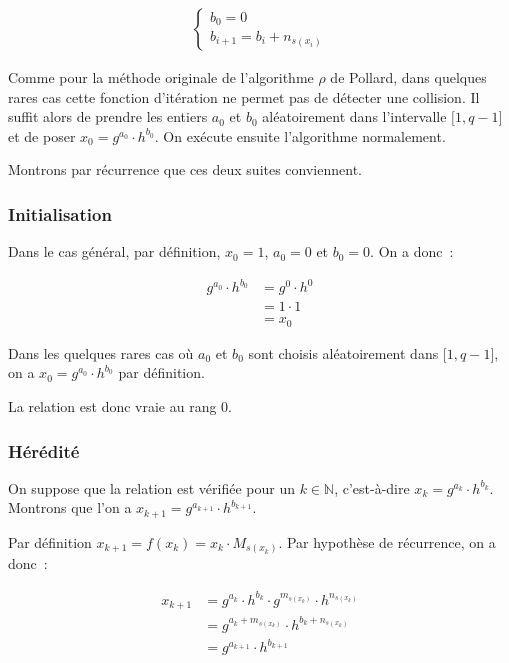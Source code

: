       \begin{align*}
        \begin{cases}
          b_0 = 0 \\
          b_{i+1} = b_i + n_{s(x_i)}
        \end{cases}
      \end{align*}

      Comme pour la méthode originale de l'algorithme $\rho$ de Pollard, dans quelques rares cas cette fonction d'itération ne permet pas de détecter une collision. Il suffit alors de prendre les entiers $a_0$ et $b_0$ aléatoirement dans l'intervalle $\mathopen{[}1,q-1\mathclose{]}$ et de poser $x_0 = g^{a_0} \cdot h^{b_0}$. On exécute ensuite l'algorithme normalement.

      Montrons par récurrence que ces deux suites conviennent.

        \subsubsection*{Initialisation}
        Dans le cas général, par définition, $x_0 = 1$, $a_0 = 0$ et $b_0 = 0$. On a donc~:

        \begin{align*}
              g^{a_0} \cdot h^{b_0} &= g^{0} \cdot h^{0} \\
                                    &= 1 \cdot 1 \\
                                    &= x_0
        \end{align*}

        Dans les quelques rares cas où $a_0$ et $b_0$ sont choisis aléatoirement dans $\mathopen{[}1,q-1\mathclose{]}$, on a $x_0 = g^{a_0} \cdot h^{b_0}$ par définition.

        La relation est donc vraie au rang $0$.

        \subsubsection*{Hérédité}
        On suppose que la relation est vérifiée pour un $k \in \mathbb{N}$, c'est-à-dire $x_k = g^{a_k} \cdot h^{b_k}$. Montrons que l'on a $x_{k+1} = g^{a_{k+1}} \cdot h^{b_{k+1}}$.

        Par définition $x_{k+1} = f(x_k) = x_k \cdot M_{s(x_k)}$. Par hypothèse de récurrence, on a donc~:

        \begin{align*}
           x_{k+1} &= g^{a_k} \cdot h^{b_k} \cdot g^{m_{s(x_k)}} \cdot h^{n_{s(x_k)}} \\
                   &= g^{a_k + m_{s(x_k)}} \cdot h^{b_k + n_{s(x_k)}} \\
                   &=g^{a_{k+1}} \cdot h^{b_{k+1}}
        \end{align*}

